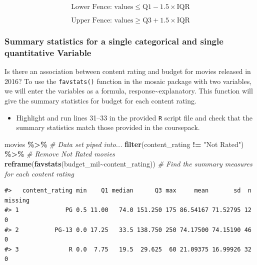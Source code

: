 \documentclass[
]{report}
\newenvironment{Shaded}{\begin{snugshade}}{\end{snugshade}}
\newcommand{\CommentTok}[1]{\textcolor[rgb]{0.56,0.35,0.01}{\textit{#1}}}
\newcommand{\FunctionTok}[1]{\textcolor[rgb]{0.13,0.29,0.53}{\textbf{#1}}}
\newcommand{\NormalTok}[1]{#1}
\newcommand{\SpecialCharTok}[1]{\textcolor[rgb]{0.81,0.36,0.00}{\textbf{#1}}}
\newcommand{\StringTok}[1]{\textcolor[rgb]{0.31,0.60,0.02}{#1}}
\providecommand{\tightlist}{%
  \setlength{\itemsep}{0pt}\setlength{\parskip}{0pt}}
\begin{document}
\[\text{Lower Fence: values} \le \text{Q}1 - 1.5\times\text{IQR}\]

\[\text{Upper Fence: values} \ge \text{Q}3 + 1.5\times\text{IQR}\]
\vspace{1.8in}

\hypertarget{summary-statistics-for-a-single-categorical-and-single-quantitative-variable}{%
\subsubsection*{Summary statistics for a single categorical and single quantitative Variable}\label{summary-statistics-for-a-single-categorical-and-single-quantitative-variable}}

Is there an association between content rating and budget for movies released in 2016? To use the \texttt{favstats()} function in the mosaic package with two variables, we will enter the variables as a formula, response\textasciitilde explanatory. This function will give the summary statistics for budget for each content rating.

\begin{itemize}
\tightlist
\item
  Highlight and run lines 31--33 in the provided \texttt{R} script file and check that the summary statistics match those provided in the coursepack.
\end{itemize}

\begin{Shaded}
\begin{Highlighting}[]
\NormalTok{movies }\SpecialCharTok{\%\textgreater{}\%} \CommentTok{\# Data set piped into...}
  \FunctionTok{filter}\NormalTok{(content\_rating }\SpecialCharTok{!=} \StringTok{"Not Rated"}\NormalTok{) }\SpecialCharTok{\%\textgreater{}\%} \CommentTok{\# Remove Not Rated movies}
  \FunctionTok{reframe}\NormalTok{(}\FunctionTok{favstats}\NormalTok{(budget\_mil}\SpecialCharTok{\textasciitilde{}}\NormalTok{content\_rating)) }\CommentTok{\# Find the summary measures for each content rating}
\end{Highlighting}
\end{Shaded}

\begin{verbatim}
#>   content_rating min    Q1 median      Q3 max     mean       sd  n missing
#> 1             PG 0.5 11.00   74.0 151.250 175 86.54167 71.52795 12       0
#> 2          PG-13 0.0 17.25   33.5 138.750 250 74.17500 74.15190 46       0
#> 3              R 0.0  7.75   19.5  29.625  60 21.09375 16.99926 32       0
\end{verbatim}
\end{document}
